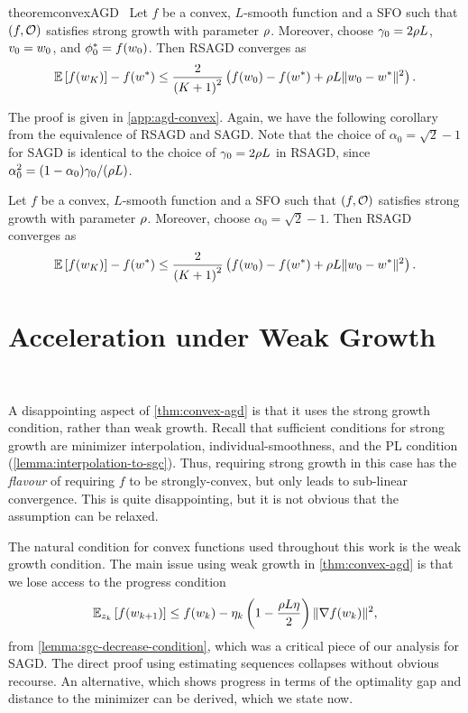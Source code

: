 \begin{restatable}{theorem}{convexAGD}~\label{thm:convex-agd}
    Let \( f \) be a convex, \( L \)-smooth function and \oracle{} a \ac{SFO} such that \( \rbr{f, \oracle{}} \) satisfies strong growth with parameter \( \sgc \).
    Moreover, choose \( \gamma_0 = 2 \sgc L \), \( v_0 = \w_0 \), and \( \phi_0^* = f(\w_0) \).
    Then \ac{RSAGD} converges as  
    \[ \E\sbr{f(\w_K)} - f(\wopt) \leq \frac{2}{\rbr{K+1}^2}\rbr{f(\w_0) - f(\wopt) + \sgc L \norm{\w_0 - \wopt}^2 }. \]
\end{restatable}

\noindent The proof is given in \autoref{app:agd-convex}.
Again, we have the following corollary from the equivalence of \ac{RSAGD} and \ac{SAGD}. 
Note that the choice of \( \alpha_0 = \sqrt{2} - 1 \) for \ac{SAGD} is identical to the choice of \( \gamma_0 = 2 \sgc L \) in \ac{RSAGD}, since \( \alpha_0^2 = (1 - \alpha_0) \gamma_0 / (\sgc L) \).

\begin{corollary}
    Let \( f \) be a convex, \( L \)-smooth function and \oracle{} a \ac{SFO} such that \( \rbr{f, \oracle{}} \) satisfies strong growth with parameter \( \sgc \).
    Moreover, choose \( \alpha_0 = \sqrt{2} - 1 \).
    Then \ac{RSAGD} converges as  
    \[ \E\sbr{f(\w_K)} - f(\wopt) \leq \frac{2}{\rbr{K+1}^2}\rbr{f(\w_0) - f(\wopt) + \sgc L \norm{\w_0 - \wopt}^2 }. \]
\end{corollary}

\section{Acceleration under Weak Growth}~\label{sec:agd-weak-growth}

 A disappointing aspect of \autoref{thm:convex-agd} is that it uses the strong growth condition, rather than weak growth.
 Recall that sufficient conditions for strong growth are minimizer interpolation, individual-smoothness, and the \ac{PL} condition (\autoref{lemma:interpolation-to-sgc}). 
 Thus, requiring strong growth in this case has the \emph{flavour} of requiring \( f \) to be strongly-convex, but only leads to sub-linear convergence.
This is quite disappointing, but it is not obvious that the assumption can be relaxed.

The natural condition for convex functions used throughout this work is the weak growth condition.
The main issue using weak growth in \autoref{thm:convex-agd} is that we lose access to the progress condition 
\[ \Ek \sbr{f(\wkk)} \leq f(\wk) - \etak \rbr{1 - \frac{\sgc L \eta}{2}} \norm{\grad(\wk)}^2, \]
from \autoref{lemma:sgc-decrease-condition}, which was a critical piece of our analysis for \ac{SAGD}. 
The direct proof using estimating sequences collapses without obvious recourse.
\iflong%
An alternative, which shows progress in terms of the optimality gap and distance to the minimizer can be derived, which we state now.

